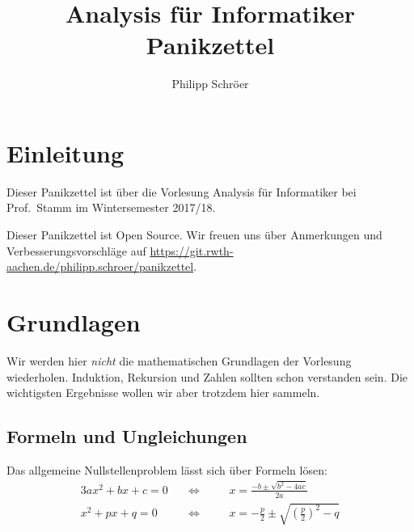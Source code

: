 \documentclass{panikzettel}
\title{Analysis für Informatiker Panikzettel}
\author{Philipp Schröer}
\begin{document}
\maketitle

\tableofcontents

\section{Einleitung}

Dieser Panikzettel ist über die Vorlesung Analysis für Informatiker bei Prof.\ Stamm im Wintersemester 2017/18.

Dieser Panikzettel ist Open Source.
Wir freuen uns über Anmerkungen und Verbesserungsvorschläge auf \url{https://git.rwth-aachen.de/philipp.schroer/panikzettel}.

\section{Grundlagen}

Wir werden hier \emph{nicht} die mathematischen Grundlagen der Vorlesung wiederholen. Induktion, Rekursion und Zahlen sollten schon verstanden sein. Die wichtigsten Ergebnisse wollen wir aber trotzdem hier sammeln.

\subsection{Formeln und Ungleichungen}

Das allgemeine Nullstellenproblem lässt sich über Formeln lösen:
\begin{alignat*}{3}
  ax^2 + bx + c = 0
  &\quad\Leftrightarrow\quad
  &&x = \frac{-b \pm \sqrt{b^2 - 4ac}}{2a} \\
  x^2 + px + q = 0
  &\quad\Leftrightarrow\quad
  &&x = -\frac{p}{2} \pm \sqrt{\left(\frac{p}{2}\right)^2 - q}
\end{alignat*}
\end{document}
